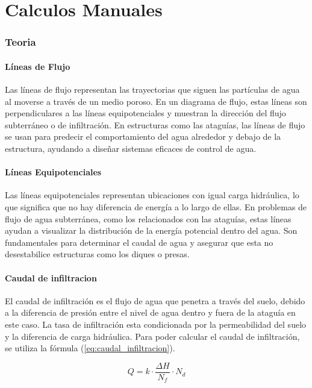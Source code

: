 \part{Calculos Manuales}

\section{Teoria}
\subsection{Líneas de Flujo}
Las líneas de flujo representan las trayectorias que siguen las partículas de agua al moverse a través de un medio poroso. En un diagrama de flujo, estas líneas son perpendiculares a las líneas equipotenciales y muestran la dirección del flujo subterráneo o de infiltración. En estructuras como las ataguías, las líneas de flujo se usan para predecir el comportamiento del agua alrededor y debajo de la estructura, ayudando a diseñar sistemas eficaces de control de agua. \cite{structville}

\subsection{Líneas Equipotenciales}
Las líneas equipotenciales representan ubicaciones con igual carga hidráulica, lo que significa que no hay diferencia de energía a lo largo de ellas. En problemas de flujo de agua subterránea, como los relacionados con las ataguías, estas líneas ayudan a visualizar la distribución de la energía potencial dentro del agua. Son fundamentales para determinar el caudal de agua y asegurar que esta no desestabilice estructuras como los diques o presas. \cite{structville}

\subsection{Caudal de infiltracion}

El caudal de infiltración es el flujo de agua que penetra a través del suelo, debido a la diferencia de presión entre el nivel de agua dentro y fuera de la ataguía en este caso. La tasa de infiltración esta condicionada por la permeabilidad del suelo y la diferencia de carga hidráulica. Para poder calcular el caudal de infiltración, se utiliza la fórmula (\ref{eq:caudal_infiltracion}). \cite{stability_cofferdam_2024}

\begin{equation}
    Q = k \cdot \frac{\Delta H}{N_{f}} \cdot N_{d}
    \label{eq:caudal_infiltracion}
\end{equation}

